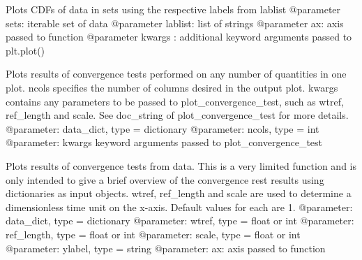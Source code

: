\documentclass[letterpaper,10pt,english]{sphinxmanual}
\begin{document}

\begin{fulllineitems}
\label{\detokenize{index:windtunnel.plot_cdfs}}
Plots CDFs of data in sets using the respective labels from lablist
@parameter sets: iterable set of data
@parameter lablist: list of strings
@parameter ax: axis passed to function
@parameter kwargs : additional keyword arguments passed to plt.plot()

\end{fulllineitems}


\begin{fulllineitems}
\label{\detokenize{index:windtunnel.plot_convergence}}
Plots results of convergence tests performed on any number of 
quantities in one plot. ncols specifies the number of columns desired in
the output plot. kwargs contains any parameters to be passed to
plot\_convergence\_test, such as wtref, ref\_length and scale. See doc\_string
of plot\_convergence\_test for more details.
@parameter: data\_dict, type = dictionary
@parameter: ncols, type = int
@parameter: kwargs keyword arguments passed to plot\_convergence\_test

\end{fulllineitems}


\begin{fulllineitems}
\label{\detokenize{index:windtunnel.plot_convergence_test}}
Plots results of convergence tests  from data. This is a very limited 
function and is only intended to give a brief overview of the convergence
rest results using dictionaries as input objects. wtref, ref\_length and 
scale are used to determine a dimensionless time unit on the x-axis. 
Default values for each are 1.
@parameter: data\_dict, type = dictionary
@parameter: wtref, type = float or int
@parameter: ref\_length, type = float or int
@parameter: scale, type = float or int
@parameter: ylabel, type = string
@parameter: ax: axis passed to function

\end{fulllineitems}
\end{document}
